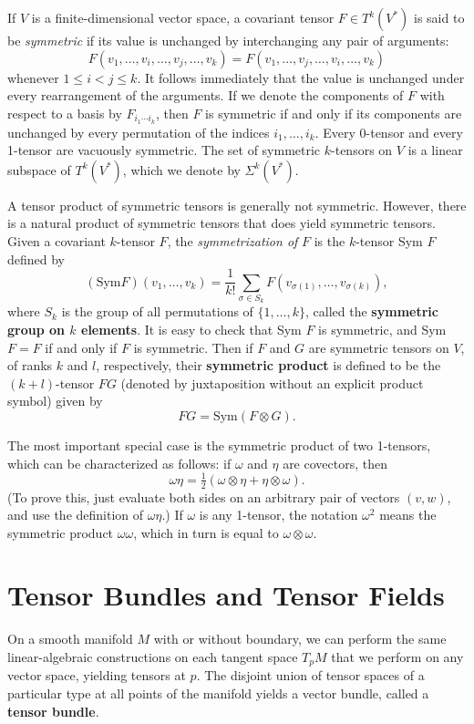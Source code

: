 If $V$ is a finite-dimensional vector space, a covariant tensor $F \in T^k(V^*)$ is said to be \textit{symmetric} if its value is unchanged by interchanging any pair of arguments:
\[
F(v_1,\ldots,v_i,\ldots,v_j,\ldots,v_k) = F(v_1,\ldots,v_j,\ldots,v_i,\ldots,v_k)
\]
whenever $1 \le i < j \le k$. It follows immediately that the value is unchanged under every rearrangement of the arguments. If we denote the components of $F$ with respect to a basis by $F_{i_1 \cdots i_k}$, then $F$ is symmetric if and only if its components are unchanged by every permutation of the indices $i_1,\ldots,i_k$. Every 0-tensor and every 1-tensor are vacuously symmetric. The set of symmetric $k$-tensors on $V$ is a linear subspace of $T^k(V^*)$, which we denote by $\Sigma^k(V^*)$.

A tensor product of symmetric tensors is generally not symmetric. However, there is a natural product of symmetric tensors that does yield symmetric tensors. Given a covariant $k$-tensor $F$, the \textit{symmetrization of} $F$ is the $k$-tensor Sym $F$ defined by
\[
(\text{Sym} F)(v_1,\ldots,v_k) = \frac{1}{k!} \sum_{\sigma \in S_k} F(v_{\sigma(1)},\ldots,v_{\sigma(k)}),
\]
where $S_k$ is the group of all permutations of $\{1,\ldots,k\}$, called the \textbf{symmetric group on $k$ elements}. It is easy to check that Sym $F$ is symmetric, and Sym $F = F$ if and only if $F$ is symmetric. Then if $F$ and $G$ are symmetric tensors on $V$, of ranks $k$ and $l$, respectively, their \textbf{symmetric product} is defined to be the $(k + l)$-tensor $FG$ (denoted by juxtaposition without an explicit product symbol) given by
\[
FG = \text{Sym}(F \otimes G).
\]

The most important special case is the symmetric product of two 1-tensors, which can be characterized as follows: if $\omega$ and $\eta$ are covectors, then
\[
\omega\eta = \tfrac{1}{2}(\omega \otimes \eta + \eta \otimes \omega).
\]
(To prove this, just evaluate both sides on an arbitrary pair of vectors $(v, w)$, and use the definition of $\omega\eta$.) If $\omega$ is any 1-tensor, the notation $\omega^2$ means the symmetric product $\omega\omega$, which in turn is equal to $\omega \otimes \omega$.

\section{Tensor Bundles and Tensor Fields}

On a smooth manifold $M$ with or without boundary, we can perform the same linear-algebraic constructions on each tangent space $T_p M$ that we perform on any vector space, yielding tensors at $p$. The disjoint union of tensor spaces of a particular type at all points of the manifold yields a vector bundle, called a \textbf{tensor bundle}.

